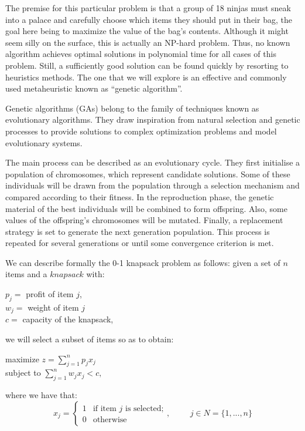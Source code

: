 \documentclass[anon]{CI}
\begin{document}
The premise for this particular problem is that a group of 18 ninjas must sneak into a palace and carefully choose which items they should put in their bag, the goal here being to maximize the value of the bag's contents. Although it might seem silly on the surface, this is actually an NP-hard problem. Thus, no known algorithm achieves optimal solutions in polynomial time for all cases of this problem. Still, a sufficiently good solution can be found quickly by resorting to heuristics methods. The one that we will explore is an effective and commonly used metaheuristic known as \enquote{genetic algorithm}.

Genetic algorithms (GAs) belong to the family of techniques known as evolutionary algorithms. They draw inspiration from natural selection and genetic processes to provide solutions to complex optimization problems and model evolutionary systems.

The main process can be described as an evolutionary cycle. They first initialise a population of chromosomes, which represent candidate solutions. Some of these individuals will be drawn from the population through a selection mechanism and compared according to their fitness. In the reproduction phase, the genetic material of the best individuals will be combined to form offspring. Also, some values of the offspring’s chromosomes will be mutated. Finally, a replacement strategy is set to generate the next generation population. This process is repeated for several generations or until some convergence criterion is met.

We can describe formally the 0-1 knapsack problem as follows: given a set of $n$ items and a $knapsack$ with:
\begin{center}
    $p_j = $ profit of item $j$, \\
    $w_j = $ weight of item $j$ \\
    $c = $ capacity of the knapsack, \\
\end{center}
we will select a subset of items so as to obtain: \\
\begin{center}
    maximize $z = \displaystyle \sum_{j=1}^n p_j x_j$ \\
    subject to $\displaystyle \sum_{j=1}^n w_j x_j < c,$ \\
\end{center}
where we have that:
$$x_j =     
    \begin{cases}
      1 & \text{if item $j$ is selected;}\\
      0 & \text{otherwise}
    \end{cases}, \hspace{1cm}
j \in N = \{1,..., n\}
$$
\end{document}
